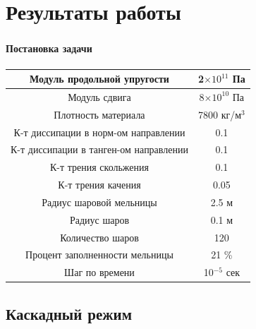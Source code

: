 \documentclass[c]{beamer}  %
\begin{document}
\section{Результаты работы}

\begin{frame}
\frametitle{\insertsection} 
\framesubtitle{Постановка задачи}

\begin{center}
\begin{tabular}{|c|c|}
\hline
Модуль продольной упругости & 2$\times 10^{11}$ Па  \\ 
\hline
Модуль сдвига & 8$\times 10^{10}$ Па \\  
\hline
Плотность материала & 7800 кг/м$^3$ \\
\hline
К-т диссипации в норм-ом направлении & 0.1 \\
\hline
К-т диссипации в танген-ом направлении & 0.1 \\
\hline
К-т трения скольжения & 0.1 \\
\hline
К-т трения качения & 0.05 \\
\hline
Радиус шаровой мельницы & 2.5 м \\
\hline
Радиус шаров & 0.1 м \\
\hline
Количество шаров & 120 \\
\hline
Процент заполненности мельницы & 21 \% \\
\hline
Шаг по времени & 10$^{-5}$ сек \\
\hline
\end{tabular}
\end{center}

\end{frame}

\subsection{Каскадный режим}
\end{document}
